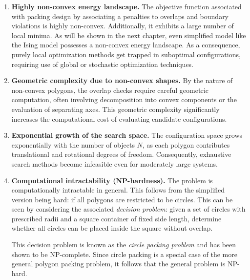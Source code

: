 \begin{enumerate}
\item \textbf{Highly non-convex energy landscape.}
The objective function associated with packing
design by associating a penalties to overlaps and boundary violations
is highly non-convex. Additionally, it exhibits a large number of local minima. 
As will be shown in the next chapter, even simplified model like 
the Ising model  possesses a 
 non-convex energy landscape. As a consequence,
  purely local optimization methods get trapped in suboptimal
   configurations, requiring use of global or 
   stochastic optimization techniques.

\item \textbf{Geometric complexity due to non-convex shapes.}
By the nature of non-convex polygons,
 the overlap checks require careful geometric
  computation, often involving decomposition into convex components
   or the evaluation of separating axes. This geometric complexity 
   significantly increases the computational cost of evaluating
    candidate configurations.

\item \textbf{Exponential growth of the search space.}
The configuration space grows exponentially with the number of objects $N$,
 as each polygon contributes translational and rotational degrees of freedom.
  Consequently, exhaustive search methods become infeasible even for moderately
   large systems.

\item \textbf{Computational intractability (NP-hardness).}
The problem is computationally intractable in general.
 This follows from the simplified version being hard: 
 if all polygons are restricted to be circles. 
 This can be seen by considering the associated \emph{decision problem}: 
 given a set of circles with prescribed radii and a square container of 
 fixed side length, determine whether all circles can be placed inside the 
 square without overlap.

This decision problem is known as the \emph{circle packing problem}
 and has been shown to be NP-complete. Since circle packing is a special case of the more general polygon packing problem, it follows that the general problem is NP-hard.

\end{enumerate}

